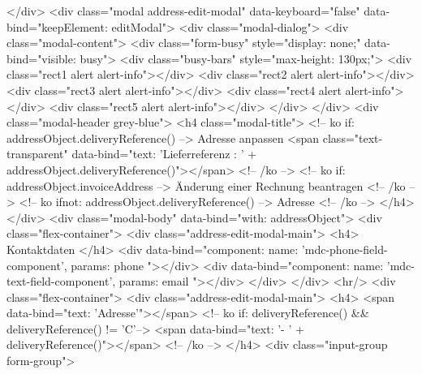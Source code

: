     </div>
    <div class="modal address-edit-modal" data-keyboard="false" data-bind="keepElement: editModal">
        <div class="modal-dialog">
            <div class="modal-content">
                <div class="form-busy" style="display: none;" data-bind="visible: busy">
                    <div class="busy-bars" style="max-height: 130px;">
                        <div class="rect1 alert alert-info"></div>
                        <div class="rect2 alert alert-info"></div>
                        <div class="rect3 alert alert-info"></div>
                        <div class="rect4 alert alert-info"></div>
                        <div class="rect5 alert alert-info"></div>
                    </div>
                </div>
                <div class="modal-header grey-blue">
                    <h4 class="modal-title">
                        <!-- ko if: addressObject.deliveryReference() -->
                        Adresse anpassen
                        <span class="text-transparent" data-bind="text: 'Lieferreferenz : ' + addressObject.deliveryReference()"></span>
                        <!-- /ko -->
                        <!-- ko if: addressObject.invoiceAddress -->
                        Änderung einer Rechnung beantragen
                        <!-- /ko -->
                        <!-- ko ifnot: addressObject.deliveryReference() -->
                        Adresse
                        <!-- /ko -->
                    </h4>
                </div>
                <div class="modal-body" data-bind="with: addressObject">
                    <div class="flex-container">
                        <div class="address-edit-modal-main">
                            <h4>
                                Kontaktdaten
                            </h4>
                            <div data-bind="component: { name: 'mdc-phone-field-component', params: phone }"></div>
                            <div data-bind="component: { name: 'mdc-text-field-component', params: email }"></div>
                        </div>
                    </div>
                    <hr/>
                    <div class="flex-container">
                        <div class="address-edit-modal-main">
                            <h4>
                                <span data-bind="text: 'Adresse'"></span>
                                <!-- ko if: deliveryReference() && deliveryReference() != 'C'-->
                                <span data-bind="text: '- ' + deliveryReference()"></span>
                                <!-- /ko -->
                            </h4>
                            <div class="input-group form-group">
